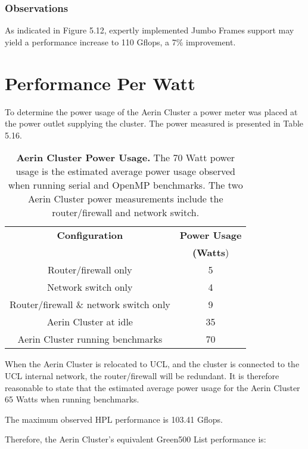 \subsubsection{Observations}

As indicated in Figure 5.12, expertly implemented Jumbo Frames support may yield a performance increase to 110 Gflops, a 7\% improvement.


%
%
\section{Performance Per Watt}

To determine the power usage of the Aerin Cluster a power meter was placed at the power outlet supplying the cluster. The power measured is presented in Table 5.16.

\begin{table}[H]
\begin{center}
\begin{tabular}{ |c|c| } 
\hline
\textbf{Configuration} & \textbf{Power Usage} \\
                       & \textbf{(Watts}) \\
\hline
Router/firewall only                   & 5 \\
\hline
Network switch only                    & 4 \\
\hline
Router/firewall \& network switch only & 9 \\
\hline
Aerin Cluster at idle                  & 35\\
\hline
Aerin Cluster running benchmarks       & 70 \\
\hline
\end{tabular}
\end{center}
\caption{\label{tab:table-name}\textbf{Aerin Cluster Power Usage.} The 70 Watt power usage is the estimated average power usage observed when running serial and OpenMP benchmarks. The two Aerin Cluster power measurements include the router/firewall and network switch.}
\end{table}

When the Aerin Cluster is relocated to UCL, and the cluster is connected to the UCL internal network, the router/firewall will be redundant. It is therefore reasonable to state that the estimated average power usage for the Aerin Cluster 65 Watts when running benchmarks.

The maximum observed HPL performance is 103.41 Gflops.

Therefore, the Aerin Cluster's equivalent Green500 List performance is:

